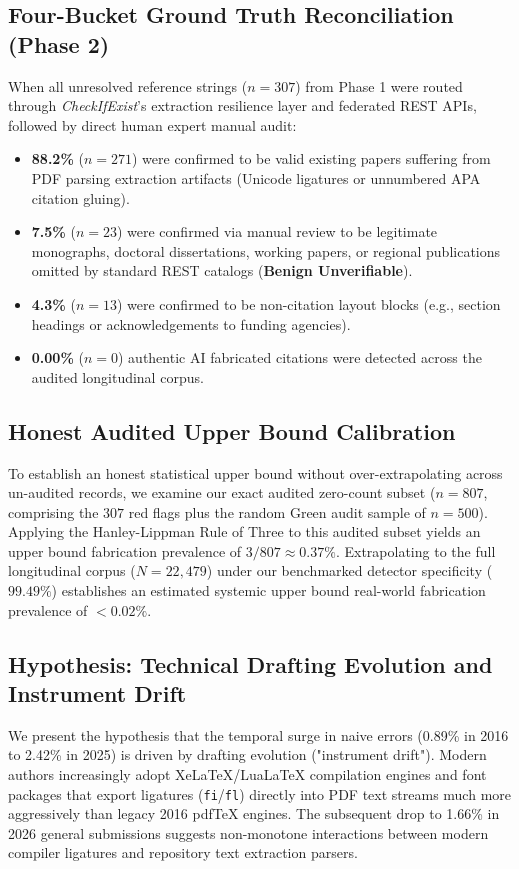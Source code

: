 \documentclass[11pt, a4paper]{article}
\begin{document}
\subsection{Four-Bucket Ground Truth Reconciliation (Phase 2)}
When all unresolved reference strings ($n=307$) from Phase 1 were routed through \textit{CheckIfExist}'s extraction resilience layer and federated REST APIs, followed by direct human expert manual audit:
\begin{itemize}
    \item \textbf{88.2\%} ($n=271$) were confirmed to be valid existing papers suffering from PDF parsing extraction artifacts (Unicode ligatures or unnumbered APA citation gluing).
    \item \textbf{7.5\%} ($n=23$) were confirmed via manual review to be legitimate monographs, doctoral dissertations, working papers, or regional publications omitted by standard REST catalogs (\textbf{Benign Unverifiable}).
    \item \textbf{4.3\%} ($n=13$) were confirmed to be non-citation layout blocks (e.g., section headings or acknowledgements to funding agencies).
    \item \textbf{0.00\%} ($n=0$) authentic AI fabricated citations were detected across the audited longitudinal corpus.
\end{itemize}

\subsection{Honest Audited Upper Bound Calibration}
To establish an honest statistical upper bound without over-extrapolating across un-audited records, we examine our exact audited zero-count subset ($n=807$, comprising the $307$ red flags plus the random Green audit sample of $n=500$). Applying the Hanley-Lippman Rule of Three to this audited subset yields an upper bound fabrication prevalence of $3/807 \approx \mathbf{0.37\%}$. Extrapolating to the full longitudinal corpus ($N=22,479$) under our benchmarked detector specificity ($99.49\%$) establishes an estimated systemic upper bound real-world fabrication prevalence of \textbf{\(<0.02\%\)}.

\subsection{Hypothesis: Technical Drafting Evolution and Instrument Drift}
We present the hypothesis that the temporal surge in naive errors (0.89\% in 2016 to 2.42\% in 2025) is driven by drafting evolution ("instrument drift"). Modern authors increasingly adopt XeLaTeX/LuaLaTeX compilation engines and font packages that export ligatures (\texttt{fi}/\texttt{fl}) directly into PDF text streams much more aggressively than legacy 2016 pdfTeX engines. The subsequent drop to 1.66\% in 2026 general submissions suggests non-monotone interactions between modern compiler ligatures and repository text extraction parsers.
\end{document}
